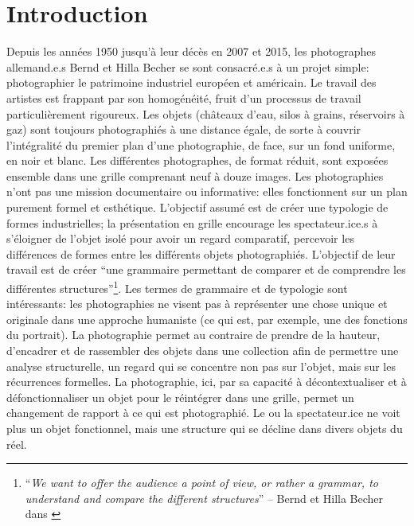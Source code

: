 \chapter*{Introduction}
Depuis les années 1950 jusqu'à leur décès en 2007 et 2015, les photographes allemand.e.s Bernd et Hilla Becher se sont consacré.e.s à un projet simple: photographier le patrimoine industriel européen et américain. Le travail des artistes est frappant par son homogénéité, fruit d'un processus de travail particulièrement rigoureux. Les objets (châteaux d'eau, silos à grains, réservoirs à gaz) sont toujours photographiés à une distance égale, de sorte à couvrir l'intégralité du premier plan d'une photographie, de face, sur un fond uniforme, en noir et blanc. Les différentes photographes, de format réduit, sont exposées ensemble dans une grille comprenant neuf à douze images. Les photographies n'ont pas une mission documentaire ou informative: elles fonctionnent sur un plan purement formel et esthétique. L'objectif assumé est de créer une typologie de formes industrielles; la présentation en grille encourage les spectateur.ice.s à s'éloigner de l'objet isolé pour avoir un regard comparatif, percevoir les différences de formes entre les différents objets photographiés. L'objectif de leur travail est de créer \enquote{une grammaire permettant de comparer et de comprendre les différentes structures}\footnote{
	\enquote{\textit{We want to offer the audience a point of view, or rather a grammar, to understand and compare the different structures}} -- Bernd et Hilla Becher dans \cite{stimson_photographic_2004}
}. Les termes de grammaire et de typologie sont intéressants: les photographies ne visent pas à représenter une chose unique et originale dans une approche humaniste (ce qui est, par exemple, une des fonctions du portrait). La photographie permet au contraire de prendre de la hauteur, d'encadrer et de rassembler des objets dans une collection afin de permettre une analyse structurelle, un regard qui se concentre non pas sur l'objet, mais sur les récurrences formelles. La photographie, ici, par sa capacité à décontextualiser et à défonctionnaliser un objet pour le réintégrer dans une grille, permet un changement de rapport à ce qui est photographié. Le ou la spectateur.ice ne voit plus un objet fonctionnel, mais une structure qui se décline dans divers objets du réel.

